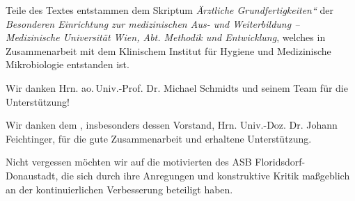 \noindent{}Teile des Textes entstammen dem Skriptum
\emph{{\quotedblbase}Ärztliche
Grundfertigkeiten{\textquotedblleft}} der \emph{Besonderen
Einrichtung zur medizinischen Aus- und Weiterbildung --
Medizinische Universität Wien, Abt. Methodik und Entwicklung}, welches in Zusammenarbeit  mit dem Klinischem Institut für Hygiene und
Medizinische Mikrobiologie entstanden ist.

\vspace{1em}

\noindent{}Wir danken Hrn. ao.\,Univ.-Prof. Dr. Michael
Schmidts und seinem Team für die Unterstützung!

\vspace{1em}

\noindent{}Wir danken dem , insbesonders dessen Vorstand,
Hrn. Univ.-Doz. Dr. Johann Feichtinger, für die gute
Zusammenarbeit und erhaltene Unterstützung.

\vspace{1em}

\noindent{}Nicht vergessen möchten wir auf die motivierten
 des ASB Florids\-dorf-Donau\-stadt, die sich durch ihre Anregungen und konstruktive
Kritik maßgeblich an der kontinuierlichen Verbesserung beteiligt haben.


